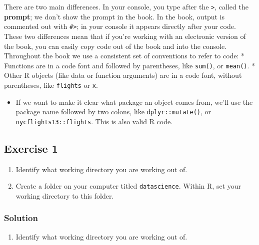 \documentclass[]{article}
\providecommand{\tightlist}{%
  \setlength{\itemsep}{0pt}\setlength{\parskip}{0pt}}
\begin{document}
There are two main differences. In your console, you type after the \texttt{\textgreater{}}, called the \textbf{prompt}; we don't show the prompt in the book. In the book, output is commented out with \texttt{\#\textgreater{}}; in your console it appears directly after your code. These two differences mean that if you're working with an electronic version of the book, you can easily copy code out of the book and into the console.
Throughout the book we use a consistent set of conventions to refer to code:
* Functions are in a code font and followed by parentheses, like \texttt{sum()},
or \texttt{mean()}.
* Other R objects (like data or function arguments) are in a code font,
without parentheses, like \texttt{flights} or \texttt{x}.

\begin{itemize}
\tightlist
\item
  If we want to make it clear what package an object comes from, we'll use
  the package name followed by two colons, like \texttt{dplyr::mutate()}, or\\
  \texttt{nycflights13::flights}. This is also valid R code.
\end{itemize}

\hypertarget{exercise-1}{%
\subsection{ Exercise 1}\label{exercise-1}}

\begin{enumerate}
\def\labelenumi{\arabic{enumi}.}
\tightlist
\item
  Identify what working directory you are working out of.
\item
  Create a folder on your computer titled \texttt{datascience}. Within R, set your working directory to this folder.
\end{enumerate}

\hypertarget{solution}{%
\subsubsection*{Solution}\label{solution}}

\begin{enumerate}
\def\labelenumi{\arabic{enumi}.}
\tightlist
\item
  Identify what working directory you are working out of.
\end{enumerate}
\end{document}
